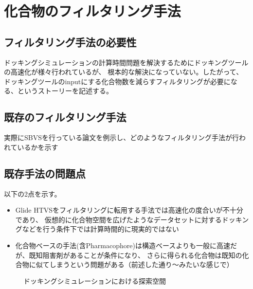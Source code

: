 \section{化合物のフィルタリング手法}

\subsection{フィルタリング手法の必要性}
ドッキングシミュレーションの計算時間問題を解決するためにドッキングツールの高速化が様々行われているが、
根本的な解決になっていない。したがって、ドッキングツールのinputにする化合物数を減らすフィルタリングが必要になる、というストーリーを記述する。
\subsection{既存のフィルタリング手法}
実際にSBVSを行っている論文を例示し、どのようなフィルタリング手法が行われているかを示す
\subsection{既存手法の問題点}
以下の2点を示す。
\begin{itemize}
\item Glide HTVSをフィルタリングに転用する手法では高速化の度合いが不十分であり、
	仮想的に化合物空間を広げたようなデータセットに対するドッキングなどを行う条件下では計算時間的に現実的ではない
\item 化合物ベースの手法(含Pharmacophore)は構造ベースよりも一般に高速だが、既知阻害剤があることが条件になり、
	さらに得られる化合物は既知の化合物に似てしまうという問題がある（前述した通り～みたいな感じで）
\end{itemize}

%
\begin{figure}[htb]
 \begin{center}
  \caption{ドッキングシミュレーションにおける探索空間}
  \label{fig:docking_freedom}
 \end{center}
\end{figure}
%
